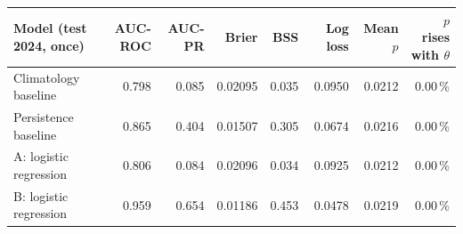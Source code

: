\begin{tabular}{lrrrrrrr}
\toprule
Model (test 2024, once) & AUC-ROC & AUC-PR & Brier & BSS & Log loss & Mean $p$ & $p$ rises with $\theta$ \\
\midrule
Climatology baseline & 0.798 & 0.085 & 0.02095 & 0.035 & 0.0950 & 0.0212 & 0.00\,\% \\
Persistence baseline & 0.865 & 0.404 & 0.01507 & 0.305 & 0.0674 & 0.0216 & 0.00\,\% \\
A: logistic regression & 0.806 & 0.084 & 0.02096 & 0.034 & 0.0925 & 0.0212 & 0.00\,\% \\
B: logistic regression & 0.959 & 0.654 & 0.01186 & 0.453 & 0.0478 & 0.0219 & 0.00\,\% \\
\bottomrule
\end{tabular}
